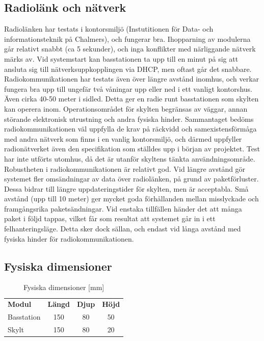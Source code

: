 \documentclass[a4paper,11pt]{article}
\begin{document}
\subsection{Radiolänk och nätverk}
Radiolänken har testats i kontorsmiljö (Instutitionen för Data- och informationsteknik på Chalmers), och fungerar bra. Ihopparning av modulerna går relativt snabbt (ca 5 sekunder), och inga konflikter med närliggande nätverk märks av. Vid systemstart kan basstationen ta upp till en minut på sig att ansluta sig till nätverksuppkopplingen via DHCP, men oftast går det snabbare. \\

Radiokommunikationen har testats även över längre avstånd inomhus, och verkar fungera bra upp till ungefär två våningar upp eller ned i ett vanligt kontorshus. Även cirka 40-50 meter i sidled. Detta ger en radie runt basstationen som skylten kan operera inom. Operationsområdet för skylten begränsas av väggar, annan störande elektronisk utrustning och andra fysiska hinder. Sammantaget bedöms radiokommunikationen väl uppfylla de krav på räckvidd och samexistensförmåga med andra nätverk som finns i en vanlig kontorsmiljö, och därmed uppfyller radionätverket även den specifikation som ställdes upp i början av projektet. Test har inte utförts utomhus, då det är utanför skyltens tänkta användningsområde. \\

Robustheten i radiokommunikationen är relativt god. Vid längre avstånd gör systemet fler omsändningar av data över radiolänken, på grund av paketförluster. Dessa bidrar till längre uppdateringstider för skylten, men är acceptabla. Små avstånd (upp till 10 meter) ger mycket goda förhållanden mellan misslyckade och framgångsrika paketsändningar. Vid enstaka tillfällen händer det att många paket i följd tappas, vilket får som resultat att systemet går in i ett felhanteringsläge. Detta sker dock sällan, och endast vid långa avstånd med fysiska hinder för radiokommunikationen.

\subsection{Fysiska dimensioner}
\begin{table}[h]
\centering
	\begin{tabular}{|l|c|c|c|}
    {\bf Modul} & {\bf Längd} & {\bf Djup} & {\bf Höjd} \\
	Basstation & 150 & 80 & 50 \\
	Skylt & 150 & 80 & 20 \\
	\end{tabular}
\caption{Fysiska dimensioner [mm]}
\label{tab:dimensiontable}
\end{table}
\end{document}
